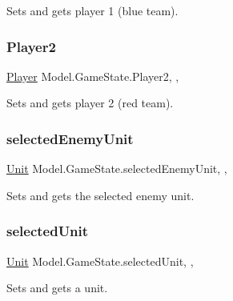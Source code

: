 Sets and gets player 1 (blue team). \hypertarget{class_model_1_1_game_state_a50fe57205063e9f0549fb2514d6430c4}{}\label{class_model_1_1_game_state_a50fe57205063e9f0549fb2514d6430c4} 
\subsubsection{\texorpdfstring{Player2}{Player2}}
{\footnotesize\ttfamily \hyperlink{class_model_1_1_player}{Player} Model.\+Game\+State.\+Player2\hspace{0.3cm}{\ttfamily [static]}, {\ttfamily [get]}, {\ttfamily [set]}}

Sets and gets player 2 (red team). \hypertarget{class_model_1_1_game_state_a8f709018e2b8d3b31dd89a3bee2f279c}{}\label{class_model_1_1_game_state_a8f709018e2b8d3b31dd89a3bee2f279c} 
\subsubsection{\texorpdfstring{selected\+Enemy\+Unit}{selectedEnemyUnit}}
{\footnotesize\ttfamily \hyperlink{interface_model_1_1_unit_module_1_1_unit}{Unit} Model.\+Game\+State.\+selected\+Enemy\+Unit\hspace{0.3cm}{\ttfamily [static]}, {\ttfamily [get]}, {\ttfamily [set]}}

Sets and gets the selected enemy unit. \hypertarget{class_model_1_1_game_state_ab163d599e6e1f46c470d0835d8053ad9}{}\label{class_model_1_1_game_state_ab163d599e6e1f46c470d0835d8053ad9} 
\subsubsection{\texorpdfstring{selected\+Unit}{selectedUnit}}
{\footnotesize\ttfamily \hyperlink{interface_model_1_1_unit_module_1_1_unit}{Unit} Model.\+Game\+State.\+selected\+Unit\hspace{0.3cm}{\ttfamily [static]}, {\ttfamily [get]}, {\ttfamily [set]}}

Sets and gets a unit. \hypertarget{class_model_1_1_game_state_a1c674970c8810751fe7e478b3cb790d4}{}\label{class_model_1_1_game_state_a1c674970c8810751fe7e478b3cb790d4} 
